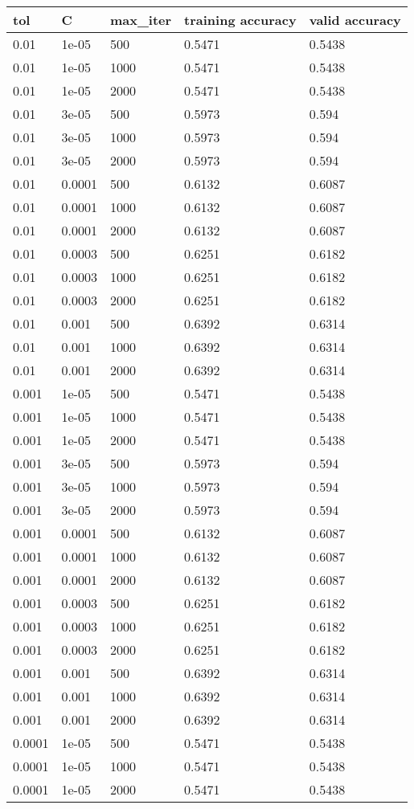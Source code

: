 \documentclass{article}%
\begin{document}
%
\normalsize%
\begin{longtable}{l l l l l}%
\hline%
tol&C&max\_iter&training accuracy&valid accuracy\\%
\hline%
\endhead%
\hline%
0.01&1e{-}05&500&0.5471&0.5438\\%
0.01&1e{-}05&1000&0.5471&0.5438\\%
0.01&1e{-}05&2000&0.5471&0.5438\\%
0.01&3e{-}05&500&0.5973&0.594\\%
0.01&3e{-}05&1000&0.5973&0.594\\%
0.01&3e{-}05&2000&0.5973&0.594\\%
0.01&0.0001&500&0.6132&0.6087\\%
0.01&0.0001&1000&0.6132&0.6087\\%
0.01&0.0001&2000&0.6132&0.6087\\%
0.01&0.0003&500&0.6251&0.6182\\%
0.01&0.0003&1000&0.6251&0.6182\\%
0.01&0.0003&2000&0.6251&0.6182\\%
0.01&0.001&500&0.6392&0.6314\\%
0.01&0.001&1000&0.6392&0.6314\\%
0.01&0.001&2000&0.6392&0.6314\\%
0.001&1e{-}05&500&0.5471&0.5438\\%
0.001&1e{-}05&1000&0.5471&0.5438\\%
0.001&1e{-}05&2000&0.5471&0.5438\\%
0.001&3e{-}05&500&0.5973&0.594\\%
0.001&3e{-}05&1000&0.5973&0.594\\%
0.001&3e{-}05&2000&0.5973&0.594\\%
0.001&0.0001&500&0.6132&0.6087\\%
0.001&0.0001&1000&0.6132&0.6087\\%
0.001&0.0001&2000&0.6132&0.6087\\%
0.001&0.0003&500&0.6251&0.6182\\%
0.001&0.0003&1000&0.6251&0.6182\\%
0.001&0.0003&2000&0.6251&0.6182\\%
0.001&0.001&500&0.6392&0.6314\\%
0.001&0.001&1000&0.6392&0.6314\\%
0.001&0.001&2000&0.6392&0.6314\\%
0.0001&1e{-}05&500&0.5471&0.5438\\%
0.0001&1e{-}05&1000&0.5471&0.5438\\%
0.0001&1e{-}05&2000&0.5471&0.5438\\%

\end{longtable}
\end{document}
